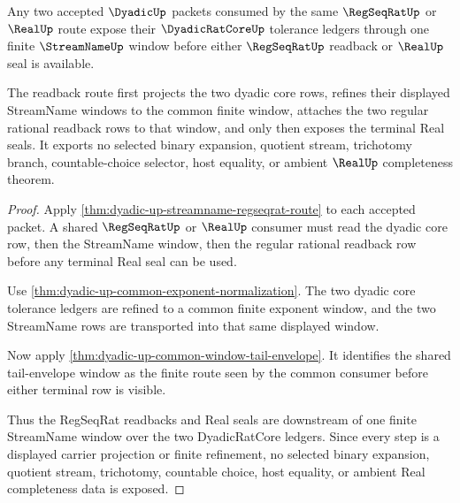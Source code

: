\begin{theorem}
\label{thm:dyadic-up-real-regseqrat-common-window-readback}
Any two accepted $\DyadicUp$ packets consumed by the same $\RegSeqRatUp$ or $\RealUp$ route expose their $\DyadicRatCoreUp$ tolerance ledgers through one finite $\StreamNameUp$ window before either $\RegSeqRatUp$ readback or $\RealUp$ seal is available.

The readback route first projects the two dyadic core rows, refines their displayed StreamName windows to the common finite window, attaches the two regular rational readback rows to that window, and only then exposes the terminal Real seals. It exports no selected binary expansion, quotient stream, trichotomy branch, countable-choice selector, host equality, or ambient $\RealUp$ completeness theorem.
\end{theorem}
\begin{proof}
Apply \autoref{thm:dyadic-up-streamname-regseqrat-route} to each accepted packet. A shared $\RegSeqRatUp$ or $\RealUp$ consumer must read the dyadic core row, then the StreamName window, then the regular rational readback row before any terminal Real seal can be used.

Use \autoref{thm:dyadic-up-common-exponent-normalization}. The two dyadic core tolerance ledgers are refined to a common finite exponent window, and the two StreamName rows are transported into that same displayed window.

Now apply \autoref{thm:dyadic-up-common-window-tail-envelope}. It identifies the shared tail-envelope window as the finite route seen by the common consumer before either terminal row is visible.

Thus the RegSeqRat readbacks and Real seals are downstream of one finite StreamName window over the two DyadicRatCore ledgers. Since every step is a displayed carrier projection or finite refinement, no selected binary expansion, quotient stream, trichotomy, countable choice, host equality, or ambient Real completeness data is exposed.
\end{proof}

